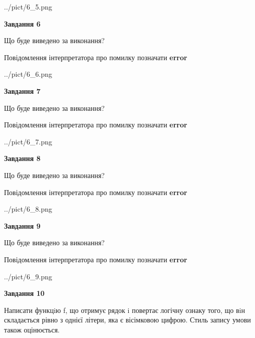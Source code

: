 \documentclass[12pt, ukrainian]{article}
\begin{document}
{\begin {large}
\begin{center}
	{../pict/6_5.png}
\end{center}
\newpage

{\begin {center}\textbf{Завдання 6}\end {center}}\par
Що буде виведено за виконання? \par
Повідомлення інтерпретатора про помилку позначати \textbf{error}

\begin{center}
	{../pict/6_6.png}
\end{center}
\newpage

{\begin {center}\textbf{Завдання 7}\end {center}}\par
Що буде виведено за виконання? \par
Повідомлення інтерпретатора про помилку позначати \textbf{error}

\begin{center}
	{../pict/6_7.png}
\end{center}
\newpage

{\begin {center}\textbf{Завдання 8}\end {center}}\par
Що буде виведено за виконання? \par
Повідомлення інтерпретатора про помилку позначати \textbf{error}

\begin{center}
	{../pict/6_8.png}
\end{center}
\newpage

{\begin {center}\textbf{Завдання 9}\end {center}}\par
Що буде виведено за виконання? \par
Повідомлення інтерпретатора про помилку позначати \textbf{error}

\begin{center}
	{../pict/6_9.png}
\end{center}
\newpage

{\begin {center}\textbf{Завдання 10}\end {center}}\par

Написати функцiю f, що отримує рядок i повертає логічну ознаку того, що вiн складається рівно з однієї літери, яка є вісімковою цифрою. Стиль запису умови також оцінюється.\par
\newpage

\end {large}}
\end{document}
